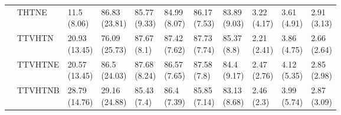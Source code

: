 \begin{table}
\begin{tabular}{lllllllllll}
       & THTNE &    \makecell{11.5\\(8.06)} &  \makecell{86.83\\(23.81)} &   \makecell{85.77\\(9.33)} &  \makecell{84.99\\(8.07)} &  \makecell{86.17\\(7.53)} &   \makecell{83.89\\(9.03)} &      \makecell{3.22\\(4.17)} &  \makecell{3.61\\(4.91)} &  \makecell{2.91\\(3.13)} \\
       & TTVHTN &  \makecell{20.93\\(13.45)} &  \makecell{76.09\\(25.73)} &    \makecell{87.67\\(8.1)} &  \makecell{87.42\\(7.62)} &  \makecell{87.73\\(7.74)} &    \makecell{85.37\\(8.8)} &      \makecell{2.21\\(2.41)} &  \makecell{3.86\\(4.75)} &  \makecell{2.66\\(2.64)} \\
       & TTVHTNE &  \makecell{20.57\\(13.45)} &   \makecell{86.5\\(24.03)} &   \makecell{87.68\\(8.24)} &  \makecell{86.57\\(7.65)} &   \makecell{87.58\\(7.8)} &    \makecell{84.4\\(9.17)} &      \makecell{2.47\\(2.76)} &  \makecell{4.12\\(5.35)} &  \makecell{2.85\\(2.98)} \\
       & TTVHTNB &  \makecell{28.79\\(14.76)} &  \makecell{29.16\\(24.88)} &    \makecell{85.43\\(7.4)} &   \makecell{86.4\\(7.39)} &  \makecell{85.85\\(7.14)} &   \makecell{83.13\\(8.68)} &       \makecell{2.46\\(2.3)} &  \makecell{3.99\\(5.74)} &  \makecell{2.87\\(3.09)} \\
\bottomrule
\end{tabular}
\end{table}
